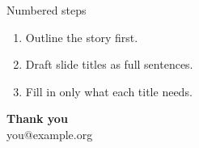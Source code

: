 \documentclass[aspectratio=169, 11pt]{beamer}
\begin{document}
\begin{frame}{Numbered steps}
  \begin{enumerate}
    \item Outline the story first.
    \item Draft slide titles as full sentences.
    \item Fill in only what each title needs.
  \end{enumerate}
\end{frame}

\begin{frame}[plain]
  \centering\vfill
  {\Huge\bfseries Thank you}\\[0.8em]
  {\textcolor{soft}{you@example.org}}
  \vfill
\end{frame}
\end{document}
